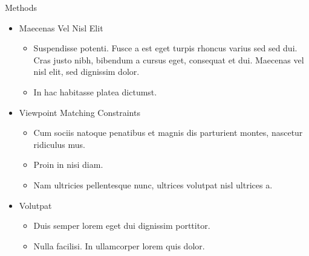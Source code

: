 \begin{block}{Methods}
	
	\begin{itemize}
		\item Maecenas Vel Nisl Elit
		\begin{itemize}
			\item Suspendisse potenti. Fusce a est eget turpis rhoncus varius sed sed dui. Cras justo nibh, bibendum a cursus eget, consequat et dui. Maecenas vel nisl elit, sed dignissim dolor. 
			\item In hac habitasse platea dictumst.
		\end{itemize}
		
		\item Viewpoint Matching Constraints
		\begin{itemize}
			\item Cum sociis natoque penatibus et magnis dis parturient montes, nascetur ridiculus mus. 
			\item Proin in nisi diam.
			\item Nam ultricies pellentesque nunc, ultrices volutpat nisl ultrices a.
		\end{itemize}
		
		\item Volutpat 
		\begin{itemize}
			\item Duis semper lorem eget dui dignissim porttitor.
			\item Nulla facilisi. In ullamcorper lorem quis dolor.
		\end{itemize}
	\end{itemize}
	
\end{block}


